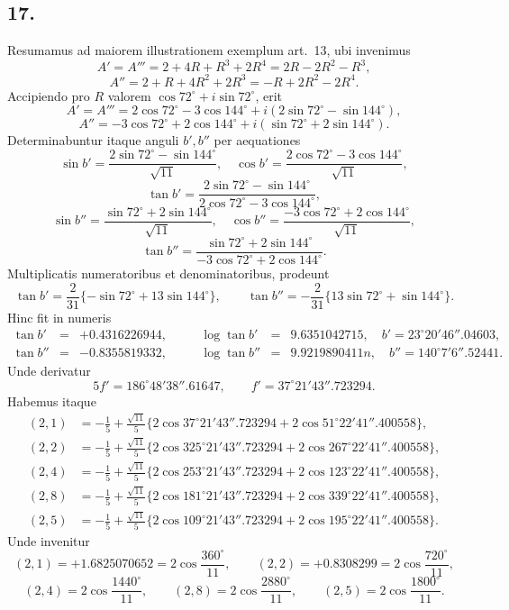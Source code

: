 \documentclass[12pt]{article}
\begin{document}
\subsection*{17.}

Resumamus ad maiorem illustrationem exemplum art.~13, ubi invenimus
\[
A'=A'''=2+4R+R^3+2R^4=2R-2R^2-R^3,
\]
\[
A''=2+R+4R^2+2R^3=-R+2R^2-2R^4.
\]
Accipiendo pro $R$ valorem $\cos72^\circ+i\sin72^\circ$, erit
\[
A'=A'''=2\cos72^\circ-3\cos144^\circ+i(2\sin72^\circ-\sin144^\circ),
\]
\[
A''=-3\cos72^\circ+2\cos144^\circ+i(\sin72^\circ+2\sin144^\circ).
\]
Determinabuntur itaque anguli $b',b''$ per aequationes
\[
\sin b'=\frac{2\sin72^\circ-\sin144^\circ}{\sqrt{11}},\quad
\cos b'=\frac{2\cos72^\circ-3\cos144^\circ}{\sqrt{11}},
\]
\[
\tan b'=\frac{2\sin72^\circ-\sin144^\circ}{2\cos72^\circ-3\cos144^\circ},
\]
\[
\sin b''=\frac{\sin72^\circ+2\sin144^\circ}{\sqrt{11}},\quad
\cos b''=\frac{-3\cos72^\circ+2\cos144^\circ}{\sqrt{11}},
\]
\[
\tan b''=\frac{\sin72^\circ+2\sin144^\circ}{-3\cos72^\circ+2\cos144^\circ}.
\]
Multiplicatis numeratoribus et denominatoribus, prodeunt
\[
\tan b'=\frac{2}{31}\{-\sin72^\circ+13\sin144^\circ\},\qquad
\tan b''=-\frac{2}{31}\{13\sin72^\circ+\sin144^\circ\}.
\]
Hinc fit in numeris
\[
\begin{array}{rclcrcl}
\tan b'&=&+0.4316226944,&\quad&\log\tan b'&=&9.6351042715,\quad b'=23^\circ20'46''.04603,\\
\tan b''&=&-0.8355819332,&\quad&\log\tan b''&=&9.9219890411n,\quad b''=140^\circ7'6''.52441.
\end{array}
\]
Unde derivatur
\[
5f'=186^\circ48'38''.61647,\qquad f'=37^\circ21'43''.723294.
\]
Habemus itaque
\[
\begin{aligned}
(2,1)&=-\frac15+\frac{\sqrt{11}}5\{2\cos37^\circ21'43''.723294+2\cos51^\circ22'41''.400558\},\\
(2,2)&=-\frac15+\frac{\sqrt{11}}5\{2\cos325^\circ21'43''.723294+2\cos267^\circ22'41''.400558\},\\
(2,4)&=-\frac15+\frac{\sqrt{11}}5\{2\cos253^\circ21'43''.723294+2\cos123^\circ22'41''.400558\},\\
(2,8)&=-\frac15+\frac{\sqrt{11}}5\{2\cos181^\circ21'43''.723294+2\cos339^\circ22'41''.400558\},\\
(2,5)&=-\frac15+\frac{\sqrt{11}}5\{2\cos109^\circ21'43''.723294+2\cos195^\circ22'41''.400558\}.
\end{aligned}
\]
Unde invenitur
\[
(2,1)=+1.6825070652=2\cos\frac{360^\circ}{11},\qquad
(2,2)=+0.8308299=2\cos\frac{720^\circ}{11},
\]
\[
(2,4)=2\cos\frac{1440^\circ}{11},\qquad
(2,8)=2\cos\frac{2880^\circ}{11},\qquad
(2,5)=2\cos\frac{1800^\circ}{11}.
\]
\end{document}
